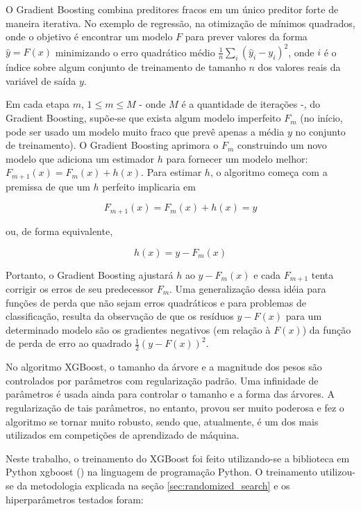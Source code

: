 O Gradient Boosting combina preditores fracos em um único preditor forte de maneira iterativa. No exemplo de regressão, na otimização de mínimos quadrados, onde o objetivo é encontrar um modelo $ F $ para prever valores da forma $ \hat{y} = F(x) $ minimizando o erro quadrático médio $ \tfrac{1}{n} \sum_{i} ({\hat{y}}_{i}-y_{i})^{2} $, onde $ i $ é o índice sobre algum conjunto de treinamento de tamanho $ n $ dos valores reais da variável de saída $ y $.

Em cada etapa $ m $, $ 1 \leq m \leq M $ - onde $ M $ é a quantidade de iterações -, do Gradient Boosting, supõe-se que exista algum modelo imperfeito $ F_{m} $ (no início, pode ser usado um modelo muito fraco que prevê apenas a média $ y $ no conjunto de treinamento). O Gradient Boosting aprimora o $ F_{m} $ construindo um novo modelo que adiciona um estimador $ h $ para fornecer um modelo melhor: $ F_{m + 1}(x) = F_{m}(x) + h(x) $. Para estimar $ h $, o algoritmo começa com a premissa de que um $ h $ perfeito implicaria em

\begin{equation}
F_{m + 1}(x) = F_{m}(x) + h(x) = y
\end{equation}

ou, de forma equivalente,

\begin{equation}
h(x) = y - F_{m}(x)
\end{equation}

Portanto, o Gradient Boosting ajustará $ h $ ao $ y - F_{m}(x) $ e cada $ F_{m + 1} $ tenta corrigir os erros de seu predecessor $ F_{m} $. Uma generalização dessa idéia para funções de perda que não sejam erros quadráticos e para problemas de classificação, resulta da observação de que os resíduos $ y - F(x) $ para um determinado modelo são os gradientes negativos (em relação à $ F(x) $) da função de perda de erro ao quadrado $ \frac{1}{2} (y - F(x))^{2} $.

No algoritmo XGBoost, o tamanho da árvore e a magnitude dos pesos são controlados por parâmetros com regularização padrão. Uma infinidade de parâmetros é usada ainda para controlar o tamanho e a forma das árvores. A regularização de tais parâmetros, no entanto, provou ser muito poderosa e fez o algoritmo se tornar muito robusto, sendo que, atualmente, é um dos mais utilizados em competições de aprendizado de máquina.

Neste trabalho, o treinamento do XGBoost foi feito utilizando-se a biblioteca em Python xgboost (\citet{Xgboost}) na linguagem de programação Python. O treinamento utilizou-se da metodologia explicada na seção \ref{sec:randomized_search} e os hiperparâmetros testados foram:

